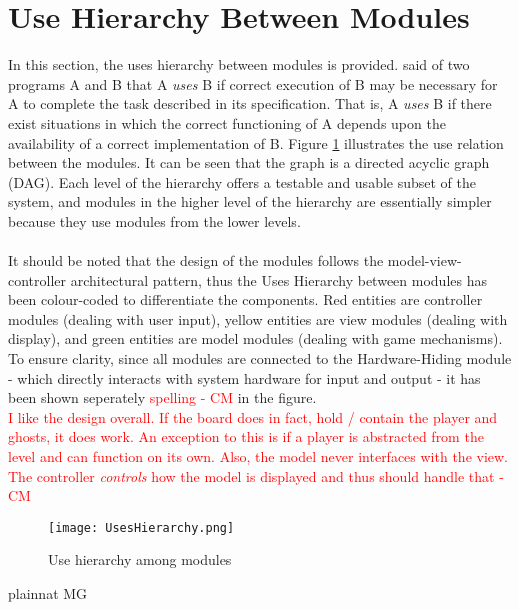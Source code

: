 \documentclass[12pt, titlepage]{article}
\begin{document}
\section{Use Hierarchy Between Modules} \label{SecUse}

In this section, the uses hierarchy between modules is
provided. \citet{Parnas1978} said of two programs A and B that A {\em uses} B if
correct execution of B may be necessary for A to complete the task described in
its specification. That is, A {\em uses} B if there exist situations in which
the correct functioning of A depends upon the availability of a correct
implementation of B.  Figure \ref{FigUH} illustrates the use relation between
the modules. It can be seen that the graph is a directed acyclic graph
(DAG). Each level of the hierarchy offers a testable and usable subset of the
system, and modules in the higher level of the hierarchy are essentially simpler
because they use modules from the lower levels.\\\\
\noindent It should be noted that the design of the modules follows the model-view-controller
architectural pattern, thus the Uses Hierarchy between modules has been colour-coded to differentiate
the components. Red entities are controller modules (dealing with user input), yellow entities are view 
modules (dealing with display), and green entities are model modules (dealing with game mechanisms).
To ensure clarity, since all modules are connected to the Hardware-Hiding module - which directly interacts
with system hardware for input and output - it has been shown seperately \textcolor{red}{spelling - CM} in the figure. \\
\textcolor{red}{I like the design overall. If the board does in fact, hold / contain the player and ghosts, it does work. An exception to this is if a player is abstracted from the level and can function on its own. Also, the model never interfaces with the view. The controller \textit{controls} how the model is displayed and thus should handle that - CM} \\
\begin{figure}[H]
\centering
\texttt{[image: UsesHierarchy.png]}
\caption{Use hierarchy among modules}
\label{FigUH}
\end{figure}

\newpage
 {plainnat}
 {MG}
\end{document}

